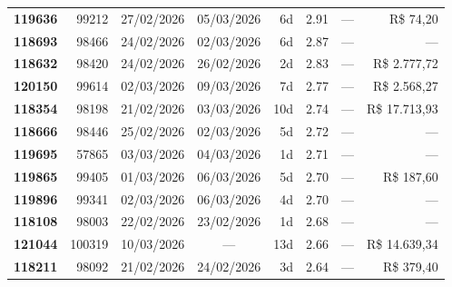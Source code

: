 \documentclass[a4paper,10pt]{article}
\begin{document}
\begin{center}
\begin{longtable}{>{\scriptsize}r>{\scriptsize}r>{\scriptsize}c>{\scriptsize}c>{\scriptsize}r>{\scriptsize}r>{\scriptsize}r>{\scriptsize}r}
\textcolor{anomyellow}{\textbf{119636}} & 99212 & 27/02/2026 & 05/03/2026 & 6d & \textcolor{anomyellow}{2.91} & --- & \textcolor{anomred}{R\$ 74,20} \\

\textcolor{anomyellow}{\textbf{118693}} & 98466 & 24/02/2026 & 02/03/2026 & 6d & \textcolor{anomyellow}{2.87} & --- & --- \\

\textcolor{anomyellow}{\textbf{118632}} & 98420 & 24/02/2026 & 26/02/2026 & 2d & \textcolor{anomyellow}{2.83} & --- & \textcolor{anomred}{R\$ 2.777,72} \\

\textcolor{anomyellow}{\textbf{120150}} & 99614 & 02/03/2026 & 09/03/2026 & 7d & \textcolor{anomyellow}{2.77} & --- & \textcolor{anomred}{R\$ 2.568,27} \\

\textcolor{anomyellow}{\textbf{118354}} & 98198 & 21/02/2026 & 03/03/2026 & 10d & \textcolor{anomyellow}{2.74} & --- & \textcolor{anomred}{R\$ 17.713,93} \\

\textcolor{anomyellow}{\textbf{118666}} & 98446 & 25/02/2026 & 02/03/2026 & 5d & \textcolor{anomyellow}{2.72} & --- & --- \\

\textcolor{anomyellow}{\textbf{119695}} & 57865 & 03/03/2026 & 04/03/2026 & 1d & \textcolor{anomyellow}{2.71} & --- & --- \\

\textcolor{anomyellow}{\textbf{119865}} & 99405 & 01/03/2026 & 06/03/2026 & 5d & \textcolor{anomyellow}{2.70} & --- & \textcolor{anomred}{R\$ 187,60} \\

\textcolor{anomyellow}{\textbf{119896}} & 99341 & 02/03/2026 & 06/03/2026 & 4d & \textcolor{anomyellow}{2.70} & --- & --- \\

\textcolor{anomyellow}{\textbf{118108}} & 98003 & 22/02/2026 & 23/02/2026 & 1d & \textcolor{anomyellow}{2.68} & --- & --- \\

\textcolor{anomyellow}{\textbf{121044}} & 100319 & 10/03/2026 & — & 13d & \textcolor{anomyellow}{2.66} & --- & \textcolor{anomred}{R\$ 14.639,34} \\

\textcolor{anomyellow}{\textbf{118211}} & 98092 & 21/02/2026 & 24/02/2026 & 3d & \textcolor{anomyellow}{2.64} & --- & \textcolor{anomred}{R\$ 379,40} \\


\end{longtable}
\end{center}
\end{document}
